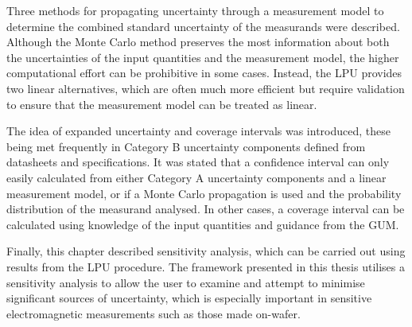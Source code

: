\documentclass[../thesis/thesis.tex]{subfiles}
\begin{document}
\begin{refsection}
Three methods for propagating uncertainty through a measurement model to determine the combined standard uncertainty of the measurands were described. Although the Monte Carlo method preserves the most information about both the uncertainties of the input quantities and the measurement model, the higher computational effort can be prohibitive in some cases. Instead, the LPU provides two linear alternatives, which are often much more efficient but require validation to ensure that the measurement model can be treated as linear.

The idea of expanded uncertainty and coverage intervals was introduced, these being met frequently in Category B uncertainty components defined from datasheets and specifications. It was stated that a confidence interval can only easily calculated from either Category A uncertainty components and a linear measurement model, or if a Monte Carlo propagation is used and the probability distribution of the measurand analysed. In other cases, a coverage interval can be calculated using knowledge of the input quantities and guidance from the GUM.

Finally, this chapter described sensitivity analysis, which can be carried out using results from the LPU procedure. The framework presented in this thesis utilises a sensitivity analysis to allow the user to examine and attempt to minimise significant sources of uncertainty, which is especially important in sensitive electromagnetic measurements such as those made on-wafer.

\printbibliography
\end{refsection}
\end{document}

